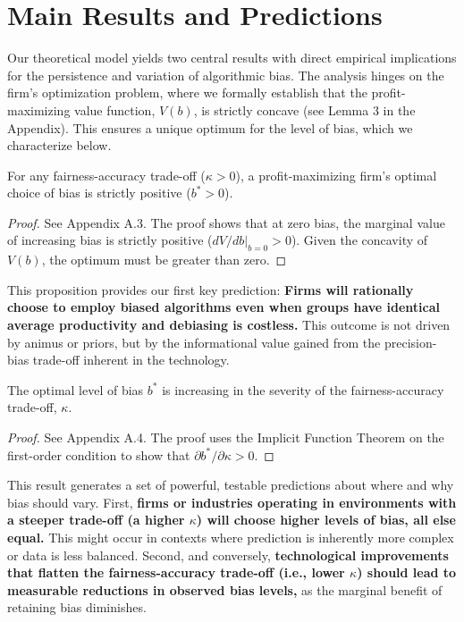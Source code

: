 \section{Main Results and Predictions}

Our theoretical model yields two central results with direct empirical implications for the persistence and variation of algorithmic bias. The analysis hinges on the firm's optimization problem, where we formally establish that the profit-maximizing value function, $V(b)$, is strictly concave (see Lemma 3 in the Appendix). This ensures a unique optimum for the level of bias, which we characterize below.

\begin{proposition}
\label{prop:existence}
For any fairness-accuracy trade-off ($\kappa > 0$), a profit-maximizing firm's optimal choice of bias is strictly positive ($b^* > 0$).
\end{proposition}
\begin{proof}
See Appendix A.3. The proof shows that at zero bias, the marginal value of increasing bias is strictly positive ($dV/db|_{b=0} > 0$). Given the concavity of $V(b)$, the optimum must be greater than zero.
\end{proof}

This proposition provides our first key prediction: \textbf{Firms will rationally choose to employ biased algorithms even when groups have identical average productivity and debiasing is costless.} This outcome is not driven by animus or priors, but by the informational value gained from the precision-bias trade-off inherent in the technology.

\begin{proposition}
\label{prop:comparative_static}
The optimal level of bias $b^*$ is increasing in the severity of the fairness-accuracy trade-off, $\kappa$.
\end{proposition}
\begin{proof}
See Appendix A.4. The proof uses the Implicit Function Theorem on the first-order condition to show that $\partial b^*/\partial\kappa > 0$.
\end{proof}

This result generates a set of powerful, testable predictions about where and why bias should vary. 
First, \textbf{firms or industries operating in environments with a steeper trade-off (a higher $\kappa$) will choose higher levels of bias, all else equal.} This might occur in contexts where prediction is inherently more complex or data is less balanced.
Second, and conversely, \textbf{technological improvements that flatten the fairness-accuracy trade-off (i.e., lower $\kappa$) should lead to measurable reductions in observed bias levels,} as the marginal benefit of retaining bias diminishes.

